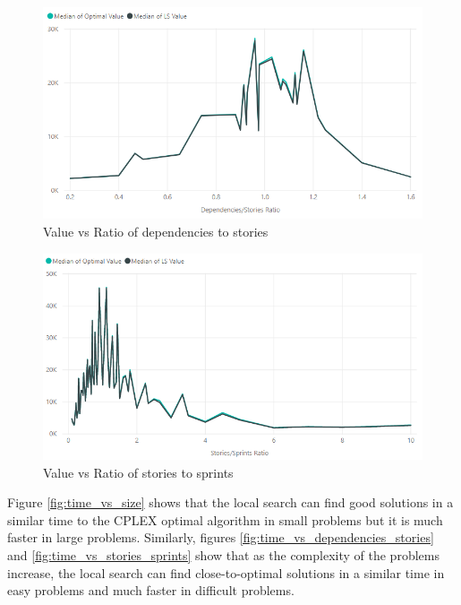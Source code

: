 \begin{figure}[h!]
    \centering
    \includegraphics[width=\textwidth]{Figures/FinalResults/annealing_value_dependencies_stories.png}
     \caption{Value vs Ratio of dependencies to stories}
     \label{fig:value_vs_dependencies_stories}
\end{figure}

\begin{figure}[h!]
    \centering
    \includegraphics[width=\textwidth]{Figures/FinalResults/annealing_value_stories_sprints.png}
     \caption{Value vs Ratio of stories to sprints}
     \label{fig:value_vs_stories_sprints}
\end{figure}

\FloatBarrier

Figure \ref{fig:time_vs_size} shows that the local search can find good solutions in a similar time to the CPLEX optimal algorithm in small problems but it is much faster in large problems. Similarly, figures \ref{fig:time_vs_dependencies_stories} and \ref{fig:time_vs_stories_sprints} show that as the complexity of the problems increase, the local search can find close-to-optimal solutions in a similar time in easy problems and much faster in difficult problems.

